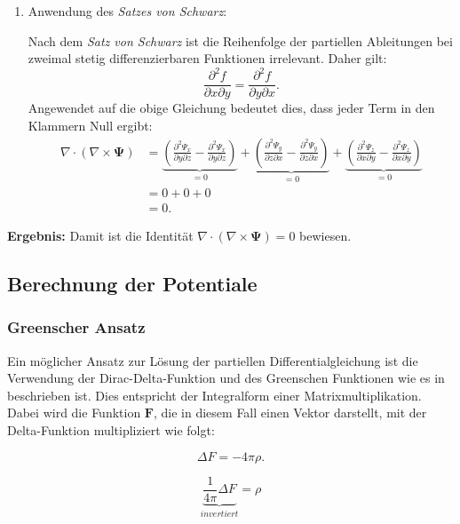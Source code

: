 \begin{enumerate}
    \item Anwendung des \emph{Satzes von Schwarz}:
    
    Nach dem \emph{Satz von Schwarz} ist die Reihenfolge der partiellen Ableitungen bei zweimal stetig differenzierbaren Funktionen irrelevant. Daher gilt:
    \[
    \frac{\partial^2 f}{\partial x \partial y} = \frac{\partial^2 f}{\partial y \partial x}.
    \]
    Angewendet auf die obige Gleichung bedeutet dies, dass jeder Term in den Klammern Null ergibt:
    \begin{align*}
    \nabla \cdot (\nabla \times \mathbf{\Psi}) &= \underbrace{\left( \frac{\partial^2 \Psi_x}{\partial y \partial z} - \frac{\partial^2 \Psi_x}{\partial y \partial z} \right)}_{=0} + \underbrace{\left( \frac{\partial^2 \Psi_y}{\partial z \partial x} - \frac{\partial^2 \Psi_y}{\partial z \partial x} \right)}_{=0} + \underbrace{\left( \frac{\partial^2 \Psi_z}{\partial x \partial y} - \frac{\partial^2 \Psi_z}{\partial x \partial y} \right)}_{=0} \\[1em]
    &= 0 + 0 + 0 \\[1em]
    &= 0.
    \end{align*}
\end{enumerate}

\textbf{Ergebnis:} Damit ist die Identität $\nabla \cdot (\nabla \times \mathbf{\Psi}) = 0$ bewiesen.


\subsection{Berechnung der Potentiale
\label{helmholtz:subsection:Berechnung der Potentiale}}

\subsubsection{Greenscher Ansatz}

Ein möglicher Ansatz zur Lösung der partiellen Differentialgleichung ist die Verwendung der Dirac-Delta-Funktion und des Greenschen Funktionen wie es in \cite{baird_helmholtz} beschrieben ist. Dies entspricht der Integralform einer Matrixmultiplikation. Dabei wird die Funktion $\mathbf{F}$, die in diesem Fall einen Vektor darstellt, mit der Delta-Funktion multipliziert wie folgt:

\begin{equation}
\Delta F = -4 \pi \rho. 
\label{helmholtz:DGL_idee}
\end{equation}

\begin{equation}
\underbrace{\frac{1}{4 \pi} \Delta F}_{invertiert} = \rho 
\label{helmholtz:DGL_idee_umformung}
\end{equation}

